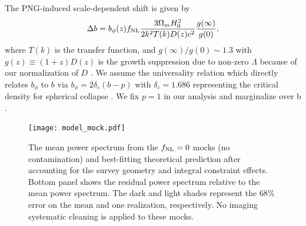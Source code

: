  The PNG-induced scale-dependent shift is given by \citep{slosar2008constraints}
\begin{equation}
\Delta b = b_{\phi}(z) f_{\rm NL} \frac{3 \Omega_{m} H^{2}_{0}}{2 k^{2}T(k)D(z) c^{2}} \frac{g(\infty)}{g(0)},
\label{eq:scaledepbias}
\end{equation}
where $T(k)$ is the transfer function, and $g(\infty)/g(0) \sim 1.3$ with $g(z)\equiv (1+z) D(z)$ is the growth suppression due to non-zero $\Lambda$ because of our normalization of $D$ \citep[see, e.g.,][]{2010JCAP...07..013R, 2019MNRAS.485.4160M}. We assume the universality relation which directly relates $b_\phi$ to $b$ via $b_{\phi} = 2 \delta_{c}(b - p)$ with $\delta_{c}= 1.686$ representing the critical density for spherical collapse \citep{fillmore1984self}. We fix $p=1$ in our analysis and marginalize over b \citep[see, also,][]{slosar2008constraints,2010JCAP...07..013R,2013MNRAS.428.1116R}. 

\begin{figure}
\centering
\texttt{[image: model\_mock.pdf]}
\caption{The mean power spectrum from the $f_{\rm NL}=0$ mocks (no contamination) and best-fitting theoretical prediction after accounting for the survey geometry and integral constraint effects. Bottom panel shows the residual power spectrum relative to the mean power spectrum. The dark and light shades represent the $68\%$ error on the mean and one realization, respectively. No imaging systematic cleaning is applied to these mocks.}\label{fig:model_mock}
\end{figure}

